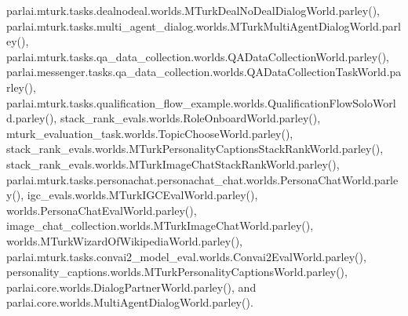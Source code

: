 parlai.\+mturk.\+tasks.\+dealnodeal.\+worlds.\+M\+Turk\+Deal\+No\+Deal\+Dialog\+World.\+parley(), parlai.\+mturk.\+tasks.\+multi\+\_\+agent\+\_\+dialog.\+worlds.\+M\+Turk\+Multi\+Agent\+Dialog\+World.\+parley(), parlai.\+mturk.\+tasks.\+qa\+\_\+data\+\_\+collection.\+worlds.\+Q\+A\+Data\+Collection\+World.\+parley(), parlai.\+messenger.\+tasks.\+qa\+\_\+data\+\_\+collection.\+worlds.\+Q\+A\+Data\+Collection\+Task\+World.\+parley(), parlai.\+mturk.\+tasks.\+qualification\+\_\+flow\+\_\+example.\+worlds.\+Qualification\+Flow\+Solo\+World.\+parley(), stack\+\_\+rank\+\_\+evals.\+worlds.\+Role\+Onboard\+World.\+parley(), mturk\+\_\+evaluation\+\_\+task.\+worlds.\+Topic\+Choose\+World.\+parley(), stack\+\_\+rank\+\_\+evals.\+worlds.\+M\+Turk\+Personality\+Captions\+Stack\+Rank\+World.\+parley(), stack\+\_\+rank\+\_\+evals.\+worlds.\+M\+Turk\+Image\+Chat\+Stack\+Rank\+World.\+parley(), parlai.\+mturk.\+tasks.\+personachat.\+personachat\+\_\+chat.\+worlds.\+Persona\+Chat\+World.\+parley(), igc\+\_\+evals.\+worlds.\+M\+Turk\+I\+G\+C\+Eval\+World.\+parley(), worlds.\+Persona\+Chat\+Eval\+World.\+parley(), image\+\_\+chat\+\_\+collection.\+worlds.\+M\+Turk\+Image\+Chat\+World.\+parley(), worlds.\+M\+Turk\+Wizard\+Of\+Wikipedia\+World.\+parley(), parlai.\+mturk.\+tasks.\+convai2\+\_\+model\+\_\+eval.\+worlds.\+Convai2\+Eval\+World.\+parley(), personality\+\_\+captions.\+worlds.\+M\+Turk\+Personality\+Captions\+World.\+parley(), parlai.\+core.\+worlds.\+Dialog\+Partner\+World.\+parley(), and parlai.\+core.\+worlds.\+Multi\+Agent\+Dialog\+World.\+parley().

